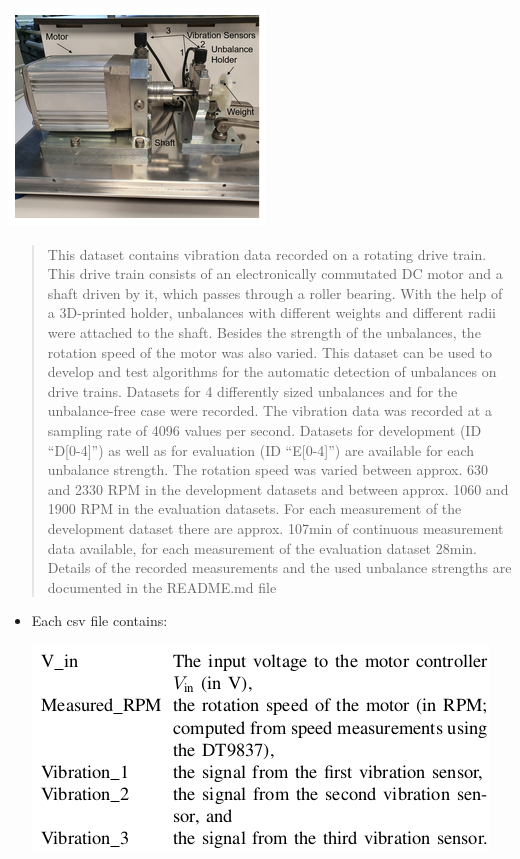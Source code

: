 \documentclass[
  letterpaper,
  DIV=11,
  numbers=noendperiod]{scrartcl}
\begin{document}
\includegraphics{img/2023-01-29-17-13-53.png}

\begin{quote}
This dataset contains vibration data recorded on a rotating drive train.
This drive train consists of an electronically commutated DC motor and a
shaft driven by it, which passes through a roller bearing. With the help
of a 3D-printed holder, unbalances with different weights and different
radii were attached to the shaft. Besides the strength of the
unbalances, the rotation speed of the motor was also varied. This
dataset can be used to develop and test algorithms for the automatic
detection of unbalances on drive trains. Datasets for 4 differently
sized unbalances and for the unbalance-free case were recorded. The
vibration data was recorded at a sampling rate of 4096 values per
second. Datasets for development (ID ``D{[}0-4{]}'') as well as for
evaluation (ID ``E{[}0-4{]}'') are available for each unbalance
strength. The rotation speed was varied between approx. 630 and 2330 RPM
in the development datasets and between approx. 1060 and 1900 RPM in the
evaluation datasets. For each measurement of the development dataset
there are approx. 107min of continuous measurement data available, for
each measurement of the evaluation dataset 28min. Details of the
recorded measurements and the used unbalance strengths are documented in
the README.md file
\end{quote}

\begin{itemize}
\item
  Each csv file contains:

  \includegraphics{img/2023-01-29-17-22-33.png}
\end{itemize}
\end{document}
